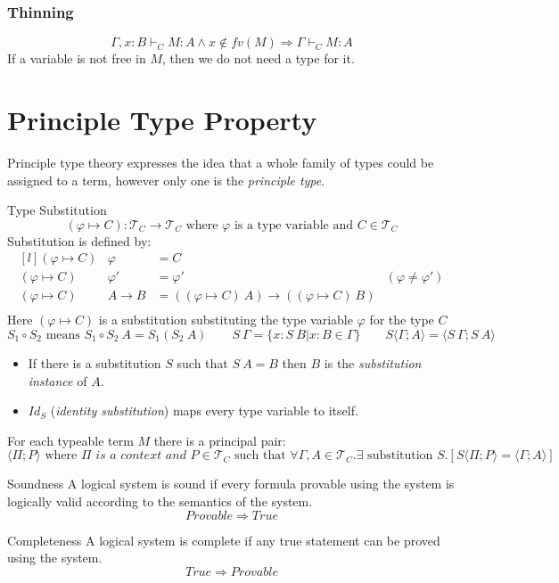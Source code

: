 \subsubsection{Thinning}
\[\Gamma, x:B \vdash_C M : A \land x \not\in fv(M) \Rightarrow \Gamma \vdash_C M : A\]
If a variable is not free in $M$, then we do not need a type for it.

\section{Principle Type Property}
Principle type theory expresses the idea that a whole family of types could be assigned to a term, however only one is the \textit{principle type}.
\begin{definitionbox}{Type Substitution}
	\[(\varphi \mapsto C) : \mathcal{T}_C \to \mathcal{T}_C \text{ where } \varphi \text{ is a type variable and } C \in \mathcal{T}_C\]
	Substitution is defined by:
	\[\begin{matrix*}[l]
			(\varphi \mapsto C) & \varphi & = C \\
			(\varphi \mapsto C) & \varphi' & = \varphi' & (\varphi \neq \varphi') \\
			(\varphi \mapsto C) & A \to B &= ((\varphi \mapsto C) \ A) \to ((\varphi \mapsto C) \ B) \\
		\end{matrix*}\]
	Here $(\varphi \mapsto C)$ is a substitution substituting the type variable $\varphi$ for the type $C$
	\[S_1 \circ S_2 \text{ means } S_1 \circ S_2 \ A = S_1 (S_2 \ A) \qquad S \ \Gamma = \{x: S \ B | x:B \in \Gamma\} \qquad S \langle \Gamma ; A \rangle = \langle S \ \Gamma ; S \ A \rangle\]
	\begin{itemize}
		\item If there is a substitution $S$ such that $S \ A = B$ then $B$ is the \textit{substitution instance} of $A$.
		\item $Id_S$ (\textit{identity substitution}) maps every type variable to itself.
	\end{itemize}
\end{definitionbox}

For each typeable term $M$ there is a principal pair:
\[\langle \Pi ; P \rangle \text{ where } \Pi \textit{ is a context and } P \in \mathcal{T}_C \text{ such that } \forall \Gamma, A \in \mathcal{T}_C . \exists \text{ substitution }S . [S \langle \Pi ; P \rangle = \langle \Gamma; A \rangle]\]

\begin{tcbraster}[raster columns=2,raster equal height]
	\begin{definitionbox}{Soundness}
		A logical system is sound if every formula provable using the system is logically valid according to the semantics of the system.
		\[Provable \Rightarrow True\]
	\end{definitionbox}
	\begin{definitionbox}{Completeness}
		A logical system is complete if any true statement can be proved using the system.
		\[True \Rightarrow Provable\]
	\end{definitionbox}
\end{tcbraster}

